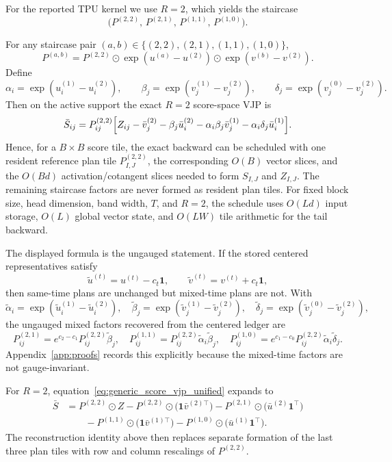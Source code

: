 For the reported TPU kernel we use $R=2$, which yields the staircase
\[
\bigl(P^{(2,2)},\,P^{(2,1)},\,P^{(1,1)},\,P^{(1,0)}\bigr).
\]

\begin{proposition}[One-Reference-Tile \texorpdfstring{$R=2$}{R=2} Backward Schedule]\label{thm:single_base_main}
For any staircase pair $(a,b)\in\{(2,2),(2,1),(1,1),(1,0)\}$,
\[
P^{(a,b)}
=
P^{(2,2)}
\odot
\exp(u^{(a)}-u^{(2)})
\odot
\exp(v^{(b)}-v^{(2)}).
\]
Define
\[
\alpha_i=\exp(u_i^{(1)}-u_i^{(2)}),
\qquad
\beta_j=\exp(v_j^{(1)}-v_j^{(2)}),
\qquad
\delta_j=\exp(v_j^{(0)}-v_j^{(2)}).
\]
Then on the active support the exact $R=2$ score-space VJP is
\[
\bar S_{ij}
=
P^{(2,2)}_{ij}
\Bigl[
Z_{ij}
-\bar v^{(2)}_j
-\beta_j\bar u^{(2)}_i
-\alpha_i\beta_j\bar v^{(1)}_j
-\alpha_i\delta_j\bar u^{(1)}_i
\Bigr].
\]
Hence, for a $B\times B$ score tile, the exact backward can be scheduled with one resident reference plan tile $P^{(2,2)}_{I,J}$, the corresponding $O(B)$ vector slices, and the $O(Bd)$ activation/cotangent slices needed to form $S_{I,J}$ and $Z_{I,J}$. The remaining staircase factors are never formed as resident plan tiles. For fixed block size, head dimension, band width, $T$, and $R=2$, the schedule uses $O(Ld)$ input storage, $O(L)$ global vector state, and $O(LW)$ tile arithmetic for the tail backward.
\end{proposition}

\begin{remark}
The displayed formula is the ungauged statement. If the stored centered representatives satisfy
\[
\widetilde u^{(t)}=u^{(t)}-c_t\mathbf{1},
\qquad
\widetilde v^{(t)}=v^{(t)}+c_t\mathbf{1},
\]
then same-time plans are unchanged but mixed-time plans are not. With
\[
\widetilde\alpha_i=\exp(\widetilde u_i^{(1)}-\widetilde u_i^{(2)}),
\quad
\widetilde\beta_j=\exp(\widetilde v_j^{(1)}-\widetilde v_j^{(2)}),
\quad
\widetilde\delta_j=\exp(\widetilde v_j^{(0)}-\widetilde v_j^{(2)}),
\]
the ungauged mixed factors recovered from the centered ledger are
\[
P^{(2,1)}_{ij}=e^{c_2-c_1}P^{(2,2)}_{ij}\widetilde\beta_j,
\quad
P^{(1,1)}_{ij}=P^{(2,2)}_{ij}\widetilde\alpha_i\widetilde\beta_j,
\quad
P^{(1,0)}_{ij}=e^{c_1-c_0}P^{(2,2)}_{ij}\widetilde\alpha_i\widetilde\delta_j.
\]
Appendix~\ref{app:proofs} records this explicitly because the mixed-time factors are not gauge-invariant.
\end{remark}

For $R=2$, equation~\eqref{eq:generic_score_vjp_unified} expands to
\begin{align}
\bar S
&=
P^{(2,2)} \odot Z
-
P^{(2,2)} \odot \bigl(\mathbf{1}\bar v^{(2)\top}\bigr)
-
P^{(2,1)} \odot \bigl(\bar u^{(2)}\mathbf{1}^\top\bigr) \nonumber \\
&\qquad
-
P^{(1,1)} \odot \bigl(\mathbf{1}\bar v^{(1)\top}\bigr)
-
P^{(1,0)} \odot \bigl(\bar u^{(1)}\mathbf{1}^\top\bigr).
\label{eq:r2_expanded_vjp}
\end{align}
The reconstruction identity above then replaces separate formation of the last three plan tiles with row and column rescalings of $P^{(2,2)}$.

